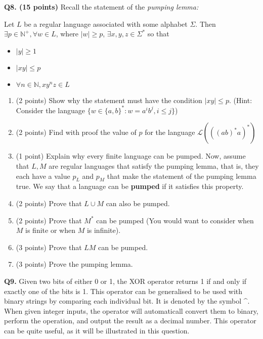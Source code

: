 \documentclass{article}
\begin{document}
    \pagebreak

    \textbf{Q8. (15 points)} Recall the statement of the \textit{pumping lemma:}

    \smallskip

    \noindent Let \(L\) be a regular language associated with some alphabet \(\Sigma\). Then \(\exists p \in \mathbb{N} ^+, \forall w \in L\), where \(|w| \geq p\), \(\exists x,y,z \in \Sigma ^*\) so that
    \begin{itemize}
        \item \(|y| \geq 1\)
        \item \(|xy| \leq p\)
        \item \(\forall n \in \mathbb{N}, xy^nz \in L\) 
    \end{itemize}

    \begin{enumerate}[label=\alph*)]
        \item (2 points) Show why the statement must have the condition \(|xy| \leq p\). (Hint: Consider the language \(\{w \in \{a, b\}^* : w = a^i b^j , i \leq j\}\))
        \vfill
        \item (2 points) Find with proof the value of \(p\) for the language \(\mathcal{L}(((ab)^*a)^*)\) 
        \vfill
        \item (1 point) Explain why every finite language can be pumped.
        \vfill
        \pagebreak
        Now, assume that \(L,M\) are regular languages that satisfy the pumping lemma, that is, they each have a value \(p_L\) and \(p_M\) that make the statement of the pumping lemma true. We say that a language can be \textbf{pumped} if it satisfies this property.
        
        \item (2 points) Prove that \(L \cup M\) can also be pumped.
        \vfill
        \item (2 points) Prove that \(M^*\) can be pumped (You would want to consider when \(M\) is finite or when \(M\) is infinite).
        \vfill
        \pagebreak
        \item (3 points) Prove that \(LM\) can be pumped.
        \vfill
        \item (3 points) Prove the pumping lemma.
        \vfill
    \end{enumerate}

    \pagebreak

    \textbf{Q9.} Given two bits of either 0 or 1, the XOR operator returns 1 if and only if exactly one of the bits is 1. This operator can be generalised to be used with binary strings by comparing each individual bit. It is denoted by the symbol \^{}. When given integer inputs, the operator will automaticall convert them to binary, perform the operation, and output the result as a decimal number. This operator can be quite useful, as it will be illustrated in this question.
\end{document}
